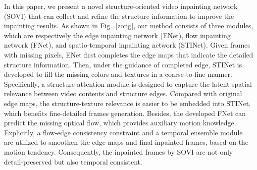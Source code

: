 In this paper, we present a novel structure-oriented video inpainting network (SOVI) that can collect and refine the structure information to improve the inpainting results. 
As shown in Fig.~\ref{zong}, our method consists of three modules, which are respectively the edge inpainting network (ENet), flow inpainting network (FNet), and spatio-temporal inpainting network (STINet).
Given frames with missing pixels, ENet first completes the edge maps that indicate the detailed structure information. Then, under the guidance of completed edge, STINet is developed to fill the missing colors and textures in a coarse-to-fine manner.
Specifically, a structure attention module is designed to capture the latent spatial relevance between video contents and structure edges.
Compared with original edge maps, the structure-texture relevance is easier to be embedded into STINet, which benefits fine-detailed frames generation.
Besides, the developed FNet can predict the missing optical flow, which provides auxiliary motion knowledge. Explicitly, a flow-edge consistency constraint and a temporal ensemble module are utilized to smoothen the edge maps and final inpainted frames, based on the motion tendency. Consequently, the inpainted frames by SOVI are not only detail-preserved but also temporal consistent.


